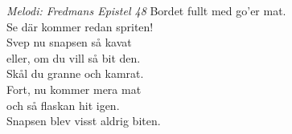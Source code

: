 {\footnotesize\textit{Melodi: Fredmans Epistel 48}}
\vspace{10pt}
Bordet fullt med go'er mat.\\
Se där kommer redan spriten!\\
Svep nu snapsen så kavat\\
eller, om du vill så bit den.\\
Skål du granne och kamrat.\\
Fort, nu kommer mera mat\\
och så flaskan hit igen.\\
Snapsen blev visst aldrig biten.
